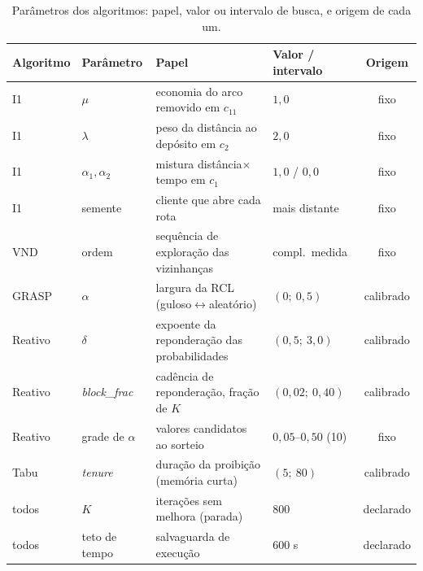 \documentclass[12pt, a4paper]{article}
\begin{document}
\begin{table}[H]
\centering
\caption{Parâmetros dos algoritmos: papel, valor ou intervalo de busca, e origem de cada um.}\label{tab:parametros}
\footnotesize\setlength{\tabcolsep}{4pt}
\begin{tabular}{llllc}
\toprule
\textbf{Algoritmo} & \textbf{Parâmetro} & \textbf{Papel} & \textbf{Valor / intervalo} & \textbf{Origem} \\
\midrule
I1        & $\mu$              & economia do arco removido em $c_{11}$        & $1{,}0$            & fixo \\
I1        & $\lambda$          & peso da distância ao depósito em $c_2$       & $2{,}0$            & fixo \\
I1        & $\alpha_1,\alpha_2$& mistura distância$\times$tempo em $c_1$      & $1{,}0$ / $0{,}0$  & fixo \\
I1        & semente            & cliente que abre cada rota                   & mais distante      & fixo \\
VND       & ordem              & sequência de exploração das vizinhanças     & compl.\ medida & fixo \\
GRASP     & $\alpha$           & largura da RCL (guloso$\leftrightarrow$aleatório) & $(0;\ 0{,}5)$ & calibrado \\
Reativo   & $\delta$           & expoente da reponderação das probabilidades  & $(0{,}5;\ 3{,}0)$  & calibrado \\
Reativo   & \textit{block\_frac} & cadência de reponderação, fração de $K$    & $(0{,}02;\ 0{,}40)$ & calibrado \\
Reativo   & grade de $\alpha$  & valores candidatos ao sorteio                & $0{,}05$--$0{,}50$ (10) & fixo \\
Tabu      & \textit{tenure}    & duração da proibição (memória curta)         & $(5;\ 80)$         & calibrado \\
todos     & $K$                & iterações sem melhora (parada)              & $800$              & declarado \\
todos     & teto de tempo      & salvaguarda de execução                      & $600$ s            & declarado \\
\bottomrule
\end{tabular}
\end{table}
\end{document}
